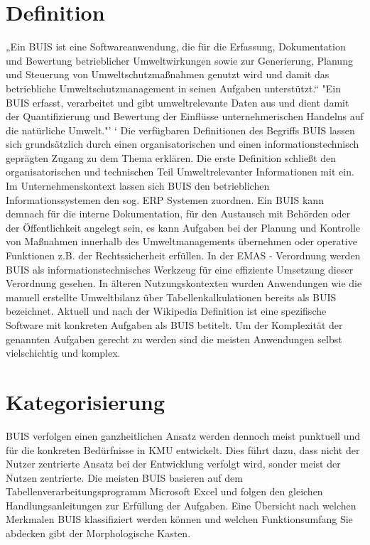 \documentclass[a4paper, 12pt, twoside, BCOR=20mm, DIV=calc, abstracton, parskip=half*, toc=bibliography, toc=listof, headsepline, footsepline, headings=small, numbers=enddot]{scrreprt}
\begin{document}
	\section{Definition}
	„Ein \ac{BUIS} %
	ist eine Softwareanwendung, die für die Erfassung, Dokumentation und Bewertung betrieblicher Umweltwirkungen sowie  zur Generierung, Planung und Steuerung von Umweltschutzmaßnahmen genutzt wird und damit das betriebliche Umweltschutzmanagement in seinen Aufgaben unterstützt.“ \cite{wohlgemuth2008konzepte}
	"Ein BUIS erfasst, verarbeitet und gibt umweltrelevante Daten aus und dient damit der Quantifizierung und Bewertung der Einflüsse unternehmerischen Handelns auf die natürliche Umwelt."'\cite{Wiki_BUIS} `
	Die verfügbaren Definitionen des Begriffs \ac{BUIS} lassen sich grundsätzlich durch einen
	organisatorischen und einen informationstechnisch geprägten Zugang zu dem Thema erklären. Die erste Definition schließt den organisatorischen und technischen Teil Umweltrelevanter Informationen mit ein. Im Unternehmenskontext lassen sich \ac{BUIS} den betrieblichen Informationssystemen den sog. \ac{ERP} Systemen zuordnen. 
	Ein \ac{BUIS} kann demnach für die interne Dokumentation, für den Austausch mit Behörden oder der Öffentlichkeit angelegt sein, es kann Aufgaben bei der Planung und Kontrolle von Maßnahmen innerhalb	des Umweltmanagements übernehmen oder operative Funktionen z.B. der Rechtssicherheit erfüllen. In der EMAS - Verordnung werden \ac{BUIS} als informationstechnisches Werkzeug für eine effiziente Umsetzung dieser Verordnung gesehen\cite[S. 109ff]{rautenstrauch1999betriebliche}.  
	 In älteren Nutzungskontexten wurden Anwendungen wie die manuell erstellte Umweltbilanz über Tabellenkalkulationen bereits als \ac{BUIS} bezeichnet. Aktuell und nach der Wikipedia Definition ist eine spezifische Software mit konkreten Aufgaben als \ac{BUIS} betitelt. Um der Komplexität der genannten Aufgaben gerecht zu werden sind die meisten Anwendungen selbst vielschichtig und komplex.
	
	\section{Kategorisierung}
	 \ac{BUIS} verfolgen einen ganzheitlichen Ansatz werden dennoch meist punktuell und für die konkreten Bedürfnisse in \ac{KMU} entwickelt. Dies führt dazu, dass nicht der Nutzer zentrierte Ansatz bei der Entwicklung verfolgt wird, sonder meist der Nutzen zentrierte. Die meisten \ac{BUIS} basieren auf dem Tabellenverarbeitungsprogramm Microsoft Excel und folgen den gleichen Handlungsanleitungen zur Erfüllung der Aufgaben. 
	Eine Übersicht nach welchen Merkmalen \ac{BUIS} klassifiziert werden können und welchen Funktionsumfang Sie abdecken gibt der Morphologische Kasten.
	
\end{document}
